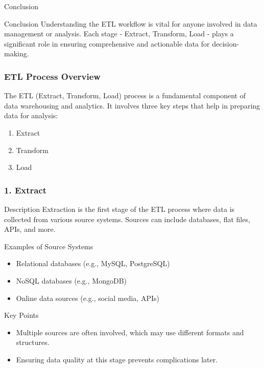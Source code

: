 \documentclass[aspectratio=169]{beamer}
\begin{document}
\begin{frame}[fragile]{Conclusion}
  \begin{block}{Conclusion}
    Understanding the ETL workflow is vital for anyone involved in data management or analysis. Each stage - Extract, Transform, Load - plays a significant role in ensuring comprehensive and actionable data for decision-making.
  \end{block}
\end{frame}

\begin{frame}[fragile]
    \frametitle{ETL Process Overview}
    The ETL (Extract, Transform, Load) process is a fundamental component of data warehousing and analytics. 
    It involves three key steps that help in preparing data for analysis:
    \begin{enumerate}
        \item Extract
        \item Transform
        \item Load
    \end{enumerate}
\end{frame}

\begin{frame}[fragile]
    \frametitle{1. Extract}
    \begin{block}{Description}
        Extraction is the first stage of the ETL process where data is collected from various source systems. 
        Sources can include databases, flat files, APIs, and more.
    \end{block}
    
    \begin{block}{Examples of Source Systems}
        \begin{itemize}
            \item Relational databases (e.g., MySQL, PostgreSQL)
            \item NoSQL databases (e.g., MongoDB)
            \item Online data sources (e.g., social media, APIs)
        \end{itemize}
    \end{block}
    
    \begin{block}{Key Points}
        \begin{itemize}
            \item Multiple sources are often involved, which may use different formats and structures.
            \item Ensuring data quality at this stage prevents complications later.
        \end{itemize}
    \end{block}
\end{frame}
\end{document}
